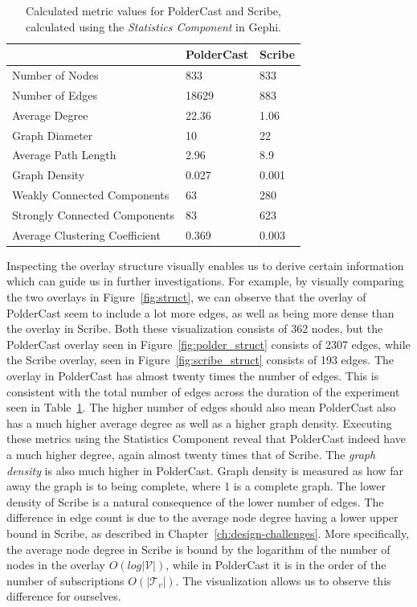 \begin{table}[h!]
    \centering
    \begin{tabular}{|l | l | l |}
        \hline
        & PolderCast & Scribe \\ \hline
        \hline
        Number of Nodes & 833 & 833 \\ \hline
        Number of Edges & 18629 & 883 \\ \hline
        Average Degree & 22.36 & 1.06 \\ \hline
        Graph Diameter & 10 & 22 \\ \hline
        Average Path Length & 2.96 & 8.9 \\ \hline
        Graph Density & 0.027 & 0.001 \\ \hline
        Weakly Connected Components & 63 & 280 \\ \hline
        Strongly Connected Components & 83 & 623 \\ \hline
        Average Clustering Coefficient & 0.369 & 0.003 \\ \hline

    \end{tabular}
    \caption{Calculated metric values for PolderCast and Scribe, calculated using
        the \emph{Statistics Component} in Gephi.}
    \label{tab:struct_metrics}
\end{table}

Inspecting the overlay structure visually enables us to derive certain
information which can guide us in further investigations. For example,
by visually comparing the two overlays in Figure~\ref{fig:struct}, we
can observe that the overlay of PolderCast seem to include a lot more
edges, as well as being more dense than the overlay in Scribe. Both
these visualization consists of 362 nodes, but the PolderCast overlay
seen in Figure~\ref{fig:polder_struct} consists of 2307 edges, while the
Scribe overlay, seen in Figure~\ref{fig:scribe_struct} consists of 193
edges. The overlay in PolderCast has almost twenty times the number of
edges. This is consistent with the total number of edges across the
duration of the experiment seen in Table~\ref{tab:struct_metrics}. The
higher number of edges should also mean PolderCast also has a much
higher average degree as well as a higher graph density. Executing these
metrics using the Statistics Component reveal that PolderCast indeed
have a much higher degree, again almost twenty times that of Scribe. The
\emph{graph density} is also much higher in PolderCast. Graph density is
measured as how far away the graph is to being complete, where 1 is a
complete graph. The lower density of Scribe is a natural consequence of
the lower number of edges. The difference in edge count is due to the
average node degree having a lower upper bound in Scribe, as described
in Chapter~\ref{ch:design-challenges}. More specifically, the average
node degree in Scribe is bound by the logarithm of the number of nodes
in the overlay $O(log |\mathcal V|)$, while in PolderCast it is in the
order of the number of subscriptions $O(|\mathcal T_v|)$. The
visualization allows us to observe this difference for ourselves.

